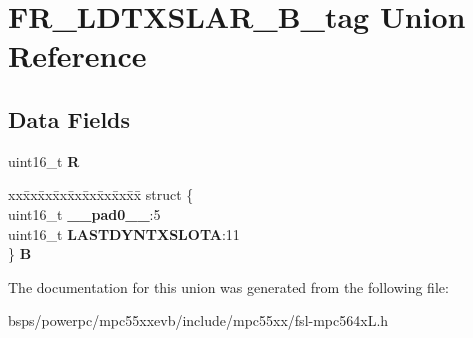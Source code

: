 \hypertarget{unionFR__LDTXSLAR__16B__tag}{}\section{F\+R\+\_\+\+L\+D\+T\+X\+S\+L\+A\+R\+\_\+B\+\_\+tag Union Reference}
\label{unionFR__LDTXSLAR__16B__tag}
\subsection*{Data Fields}
\begin{DoxyCompactItemize}
\item 
\mbox{\label{unionFR__LDTXSLAR__16B__tag_a4c0b7a7fd59d15603c5a0086129733bc}} 
uint16\+\_\+t {\bfseries R}
\item 
\mbox{\label{unionFR__LDTXSLAR__16B__tag_a4db7eb7c8f03547da341faf9f755319a}} 
\begin{tabbing}
xx\=xx\=xx\=xx\=xx\=xx\=xx\=xx\=xx\=\kill
struct \{\\
\>uint16\_t {\bfseries \_\_pad0\_\_}:5\\
\>uint16\_t {\bfseries LASTDYNTXSLOTA}:11\\
\} {\bfseries B}\\

\end{tabbing}\end{DoxyCompactItemize}


The documentation for this union was generated from the following file\+:\begin{DoxyCompactItemize}
\item 
bsps/powerpc/mpc55xxevb/include/mpc55xx/fsl-\/mpc564x\+L.\+h\end{DoxyCompactItemize}
